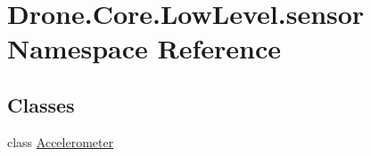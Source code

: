\hypertarget{namespace_drone_1_1_core_1_1_low_level_1_1sensor}{}\section{Drone.\+Core.\+Low\+Level.\+sensor Namespace Reference}
\label{namespace_drone_1_1_core_1_1_low_level_1_1sensor}
\subsection*{Classes}
\begin{DoxyCompactItemize}
\item 
class \hyperlink{class_drone_1_1_core_1_1_low_level_1_1sensor_1_1_accelerometer}{Accelerometer}
\end{DoxyCompactItemize}
